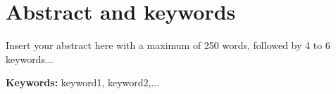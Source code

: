 
\chapter*{Abstract and keywords}


Insert your abstract here with a maximum of 250 words, followed by 4 to 6 keywords...

\vfill

\textbf{Keywords:} keyword1, keyword2,...

\cleardoublepage

